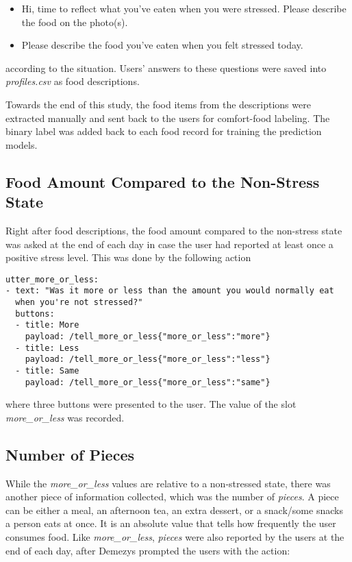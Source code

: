 \begin{itemize}
  \item Hi, time to reflect what you've eaten when you were stressed. Please describe the food on the photo(s).
  \item Please describe the food you've eaten when you felt stressed today.
\end{itemize}

\noindent according to the situation. Users' answers to these questions were saved into \emph{profiles.csv} as food descriptions.

Towards the end of this study, the food items from the descriptions were extracted manually and sent back to the users for comfort-food labeling. The binary label was added back to each food record for training the prediction models.

\subsection{Food Amount Compared to the Non-Stress State}
Right after food descriptions, the food amount compared to the non-stress state was asked at the end of each day in case the user had reported at least once a positive stress level. This was done by the following action

\begin{lstlisting}
utter_more_or_less:
- text: "Was it more or less than the amount you would normally eat
  when you're not stressed?"
  buttons:
  - title: More
    payload: /tell_more_or_less{"more_or_less":"more"}
  - title: Less
    payload: /tell_more_or_less{"more_or_less":"less"}
  - title: Same
    payload: /tell_more_or_less{"more_or_less":"same"}
\end{lstlisting}

\noindent where three buttons were presented to the user. The value of the slot \emph{more\_or\_less} was recorded.

\subsection{Number of Pieces}
While the \emph{more\_or\_less} values are relative to a non-stressed state, there was another piece of information collected, which was the number of \emph{pieces}. A piece can be either a meal, an afternoon tea, an extra dessert, or a snack/some snacks a person eats at once. It is an absolute value that tells how frequently the user consumes food. Like \emph{more\_or\_less}, \emph{pieces} were also reported by the users at the end of each day, after Demezys prompted the users with the action:

